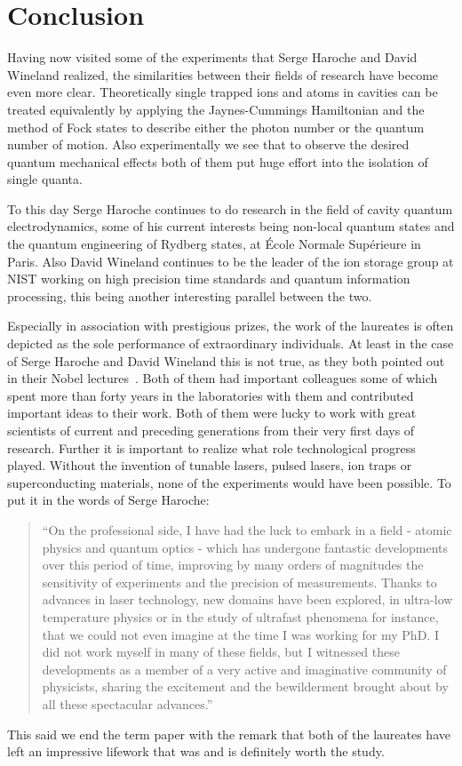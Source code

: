 \section{Conclusion}
\label{sec:Conclusion}
Having now visited some of the experiments that Serge Haroche and David Wineland
realized, the similarities between their fields of research have become even more
clear. Theoretically single trapped  ions and atoms in cavities can be 
treated equivalently by applying the Jaynes-Cummings Hamiltonian and the method of Fock states
to describe either the photon number or the quantum number of motion. Also
experimentally we see that to observe the desired quantum mechanical effects both
of them put huge effort into the isolation of single quanta.

To this day Serge Haroche continues to do research in the field of cavity
quantum electrodynamics, some of his current interests being non-local quantum
states and the quantum engineering of Rydberg states, at École Normale
Supérieure in Paris. Also David Wineland continues to be the leader of the ion
storage group at NIST working on high precision time standards and quantum
information processing, this being another interesting parallel between the two.

Especially in association with prestigious prizes, the work of the laureates is
often depicted as the sole performance of extraordinary individuals. At least in
the case of Serge Haroche and David Wineland this is not true, as they both
pointed out in their Nobel lectures~\cite{wineland2012nobel, haroche2012nobel}.
Both of them had important colleagues some of which spent more than forty years
in the laboratories with them and contributed important ideas to their work.
Both of them were lucky to work with great scientists of current and preceding
generations from their very first days of research. Further it is important to
realize what role technological progress played. Without the invention of
tunable lasers, pulsed lasers, ion traps or superconducting materials, none of
the experiments would have been possible. To put it in the words of Serge
Haroche:
\begin{quote}
  ``On the professional side, I have had the luck to embark in a field - atomic
  physics and quantum optics - which has undergone  fantastic  developments
  over this period of time, improving by many orders of magnitudes the
  sensitivity of experiments and the precision of measurements. Thanks to
  advances in laser technology, new domains have been explored, in ultra-low
  temperature physics or in the study of ultrafast phenomena for instance, that
  we could not even imagine at the time I was working for my PhD. I did not work
  myself in many of these fields, but I witnessed these developments as a member
  of a very active and imaginative community of physicists, sharing the
  excitement and the bewilderment brought about by all these spectacular
  advances.''~\cite{shbio}
\end{quote}

This said we end the term paper with the remark that both of the laureates have left an
impressive lifework that was and is definitely worth the study.
